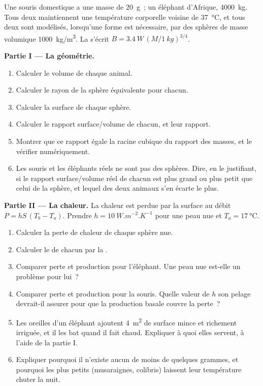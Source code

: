\begin{problem}
\label{pb:b1:organism-environment:1}
Une souris domestique a une masse de \qty{20}{g}~; un éléphant
d'Afrique, \qty{4000}{kg}. Tous deux maintiennent une température
corporelle voisine de \qty{37}{\celsius}, et tous deux sont modélisés,
lorsqu'une forme est nécessaire, par des sphères de masse volumique
\qty{1000}{kg/m^3}. La  s'écrit
$B = \qty{3.4}{W}\,(M/\qty{1}{kg})^{3/4}$.

\medskip
\noindent\textbf{Partie I --- La géométrie.}
\begin{enumerate}
  \item Calculer le volume de chaque animal.
  \item Calculer le rayon de la sphère équivalente pour chacun.
  \item Calculer la surface de chaque sphère.
  \item Calculer le rapport surface/volume de chacun, et leur rapport.
  \item Montrer que ce rapport égale la racine cubique du rapport des
        masses, et le vérifier numériquement.
  \item Les souris et les éléphants réels ne sont pas des sphères. Dire,
        en le justifiant, si le rapport surface/volume réel de chacun
        est plus grand ou plus petit que celui de la sphère, et lequel
        des deux animaux s'en écarte le plus.
\end{enumerate}

\medskip
\noindent\textbf{Partie II --- La chaleur.}
La chaleur est perdue par la surface au débit $P = hS\,(T_b - T_a)$.
Prendre $h = \qty{10}{W.m^{-2}.K^{-1}}$ pour une peau nue et $T_a =
\qty{17}{\celsius}$.
\begin{enumerate}[resume]
  \item Calculer la perte de chaleur de chaque sphère nue.
  \item Calculer le  de chacun par la .
  \item Comparer perte et production pour l'éléphant. Une peau nue est-elle
        un problème pour lui~?
  \item Comparer perte et production pour la souris. Quelle valeur de $h$
        son pelage devrait-il assurer pour que la production basale
        couvre la perte~?
  \item Les oreilles d'un éléphant ajoutent \qty{4}{m^2} de surface
        mince et richement irriguée, et il les bat quand il fait chaud.
        Expliquer à quoi elles servent, à l'aide de la partie I.
  \item Expliquer pourquoi il n'existe aucun  de moins de
        quelques grammes, et pourquoi les plus petits (musaraignes,
        colibris) laissent leur température chuter la nuit.
\end{enumerate}


\end{problem}
